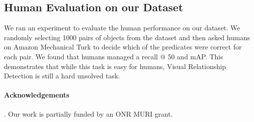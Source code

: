 \documentclass[runningheads]{llncs}
\begin{document}
\subsection{Human Evaluation on our Dataset}
We ran an experiment to evaluate the human performance on our dataset. We randomly selecting 1000 pairs of objects from the dataset and then asked humans on Amazon Mechanical Turk to decide which of the  predicates were correct for each pair. We found that humans managed a  recall @ 50 and  mAP. This demonstrates that while this task is easy for humans, Visual Relationship Detection is still a hard unsolved task.

\paragraph{Acknowledgements}. Our work is partially funded by an ONR MURI grant.




\end{document}
